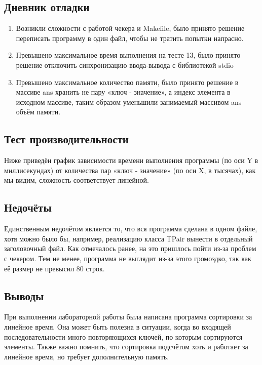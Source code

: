 \documentclass[12pt]{article}
\begin{document}
\subsection*{Дневник отладки}

\begin{enumerate}
\item Возникли сложности с работой чекера и Makefile, было принято решение переписать программу в один файл, чтобы не тратить попытки напрасно.
\item Превышено максимальное время выполнения на тесте 13, было принято решение отключить синхронизацию ввода-вывода с библиотекой stdio
\item Превышено максимальное количество памяти, было принято решение в массиве ans хранить не пару «ключ - значение», а индекс элемента в исходном массиве, таким образом уменьшили занимаемый массивом ans объём памяти.
\end{enumerate}


\subsection*{Тест производительности}

Ниже приведён график зависимости времени выполнения программы (по оси Y в миллисекундах) от количества пар «ключ - значение» (по оси X, в тысячах), как мы видим, сложность соответствует линейной.



\subsection*{Недочёты}

Единственным недочётом является то, что вся программа сделана в одном файле, хотя можно было бы, например, реализацию класса TPair вынести в отдельный заголовочный файл.
Как отмечалось ранее, на это пришлось пойти из-за проблем с чекером. Тем не менее, программа не выглядит из-за этого громоздко, так как её размер не превысил 80 строк.

\subsection*{Выводы}

При выполнении лабораторной работы была написана программа сортировки за линейное время. Она может быть полезна в ситуации, когда во входящей последовательности много повторяющихся ключей, по которым сортируются элементы.
Также важно помнить, что сортировка подсчётом хоть и работает за линейное время, но требует дополнительную память.
\end{document}
